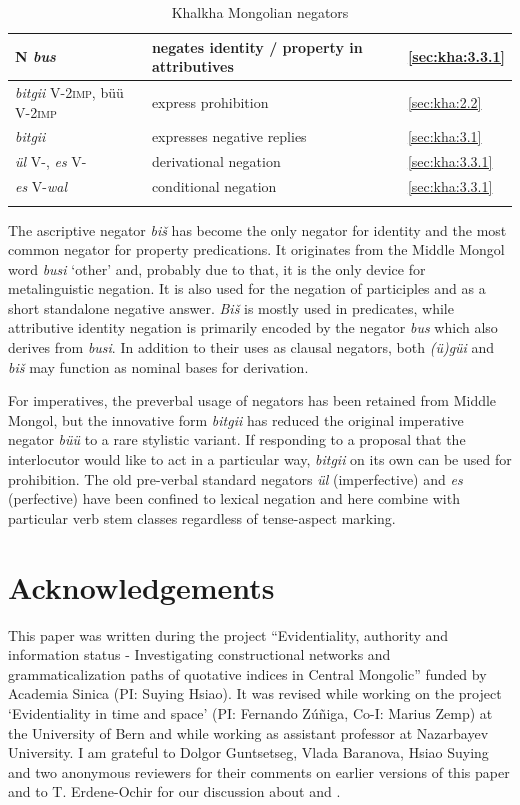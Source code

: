 \documentclass[output=paper,colorlinks,citecolor=brown,chinesefont]{langscibook}
\begin{document}
\begin{table}
\begin{tabularx}{\textwidth}{lQp{20mm}}
N \textit{bus} 
& negates identity / property in attributives & \ref{sec:kha:3.3.1}  \\

\midrule
\textit{bitgii} V-\textsc{2imp}, büü V-\textsc{2imp}
& express prohibition & \ref{sec:kha:2.2}   \\

\textit{bitgii}
&  expresses negative replies & \ref{sec:kha:3.1}  \\

\midrule
\textit{ül} V-, \textit{es} V- 
& derivational negation & \ref{sec:kha:3.3.1}  \\

\textit{es} V-\textit{wal} 
& conditional negation & \ref{sec:kha:3.3.1} \\
\lspbottomrule
    \end{tabularx}
    \caption{Khalkha Mongolian negators }
    \label{tab:kha:summary}
\end{table}

The ascriptive negator \textit{biš} has become the only negator for identity and the most common negator for property predications. It originates from the Middle Mongol word \textit{busi} ‘other’ and, probably due to that, it is the only device for meta\-linguistic negation. It is also used for the negation of participles and as a short standalone negative answer. \textit{Biš} is mostly used in predicates, while attributive identity negation is primarily encoded by the negator \textit{bus} which also derives from \textit{busi}. In addition to their uses as clausal negators, both \textit{(ü)güi} and \textit{biš} may function as nominal bases for derivation.

For imperatives, the preverbal usage of negators has been retained from \mbox{Middle} Mongol, but the innovative form \textit{bitgii} has reduced the original imperative negator \textit{büü} to a rare stylistic variant. If responding to a proposal that the interlocutor would like to act in a particular way, \textit{bitgii} on its own can be used for prohibition. The old pre-verbal standard negators \textit{ül} (imperfective) and \textit{es} (perfective) have been confined to lexical negation and here combine with particular verb stem classes regardless of tense-aspect marking.



\section*{Acknowledgements}
This paper was written during the project “Evidentiality, authority and information status - Investigating constructional networks and grammaticalization paths of quotative indices in Central Mongolic” funded by Academia Sinica (PI: Suying Hsiao). It was revised while working on the project ‘Evidentiality in time and space’ (PI: Fernando Zúñiga, Co-I: Marius Zemp) at the University of Bern and while working as assistant professor at Nazarbayev University. I am grateful to Dolgor Guntsetseg, Vlada Baranova, Hsiao Suying and two anonymous reviewers for their comments on earlier versions of this paper and to T. Erdene-Ochir for our discussion about  and .
\end{document}
